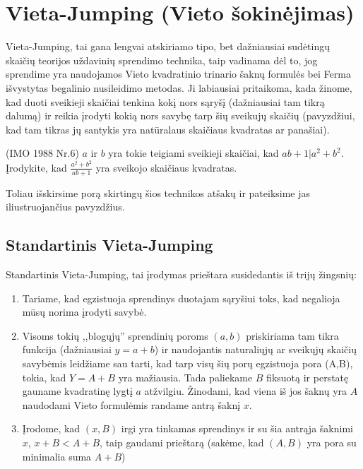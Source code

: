 \section{Vieta-Jumping (Vieto šokinėjimas)}
Vieta-Jumping, tai gana lengvai atskiriamo tipo, bet dažniausiai sudėtingų skaičių teorijos uždavinių sprendimo technika, taip vadinama dėl to, jog sprendime yra naudojamos Vieto kvadratinio trinario šaknų formulės bei Ferma išvystytas begalinio nusileidimo metodas. Ji labiausiai pritaikoma, kada žinome, kad duoti sveikieji skaičiai tenkina kokį nors sąryšį (dažniausiai tam tikrą dalumą) ir reikia įrodyti kokią nors savybę tarp šių sveikujų skaičių (pavyzdžiui, kad tam tikras jų santykis yra natūralaus skaičiaus kvadratas ar panašiai). 

\begin{pavnr}
(IMO 1988 Nr.6) $a$ ir $b$ yra tokie teigiami sveikieji skaičiai, kad $ab + 1|a^2 + b^2$. Įrodykite, kad $\frac{a^2 + b^2}{ab + 1}$ yra sveikojo skaičiaus kvadratas.
\end{pavnr}

Toliau išskirsime porą skirtingų šios technikos atšakų ir pateiksime jas iliustruojančius pavyzdžius.

\subsection{Standartinis Vieta-Jumping}
Standartinis Vieta-Jumping, tai įrodymas prieštara susidedantis iš trijų žingsnių:
\begin{enumerate}
\item Tariame, kad egzistuoja sprendinys duotajam sąryšiui toks, kad negalioja mūsų norima įrodyti savybė.
\item Visoms tokių ,,blogųjų'' sprendinių poroms $(a,b)$ priskiriama tam tikra funkcija (dažniausiai $y=a+b$) ir naudojantis naturaliųjų ar sveikųjų skaičių savybėmis leidžiame sau tarti, kad tarp visų šių porų egzistuoja pora (A,B), tokia, kad $Y=A+B$ yra mažiausia. Tada paliekame $B$ fiksuotą ir perstatę gauname kvadratinę lygtį $a$ atžvilgiu. Žinodami, kad viena iš jos šaknų yra $A$ naudodami Vieto formulėmis randame antrą šaknį $x$. 
\item Įrodome, kad $(x,B)$ irgi yra tinkamas sprendinys ir su šia antrąja šaknimi $x$, $x+B<A+B$, taip gaudami prieštarą (sakėme, kad $(A,B)$ yra pora su minimalia suma $A+B$)
\end{enumerate}

